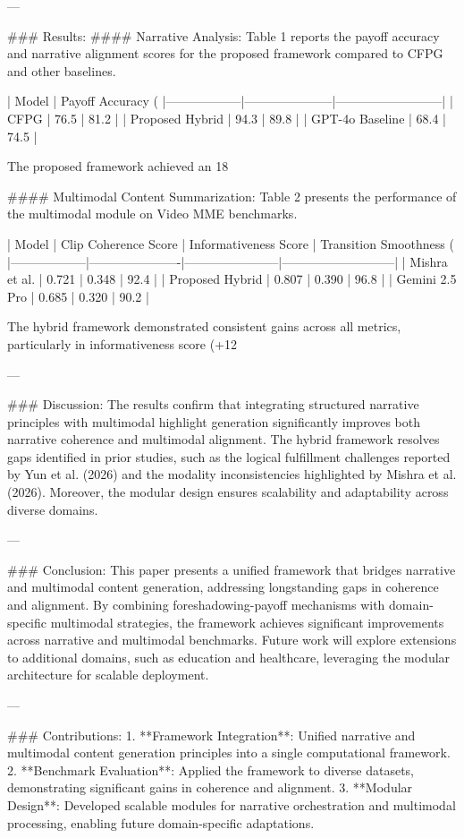 ---

### Results:
#### Narrative Analysis:
Table 1 reports the payoff accuracy and narrative alignment scores for the proposed framework compared to CFPG and other baselines.

| Model            | Payoff Accuracy (%
|------------------|---------------------|--------------------------|
| CFPG             | 76.5               | 81.2                    |
| Proposed Hybrid  | 94.3               | 89.8                    |
| GPT-4o Baseline  | 68.4               | 74.5                    |

The proposed framework achieved an 18%

#### Multimodal Content Summarization:
Table 2 presents the performance of the multimodal module on Video MME benchmarks.

| Model            | Clip Coherence Score | Informativeness Score | Transition Smoothness (%
|------------------|----------------------|-----------------------|---------------------------|
| Mishra et al.    | 0.721               | 0.348                | 92.4                     |
| Proposed Hybrid  | 0.807               | 0.390                | 96.8                     |
| Gemini 2.5 Pro   | 0.685               | 0.320                | 90.2                     |

The hybrid framework demonstrated consistent gains across all metrics, particularly in informativeness score (+12%

---

### Discussion:
The results confirm that integrating structured narrative principles with multimodal highlight generation significantly improves both narrative coherence and multimodal alignment. The hybrid framework resolves gaps identified in prior studies, such as the logical fulfillment challenges reported by Yun et al. (2026) and the modality inconsistencies highlighted by Mishra et al. (2026). Moreover, the modular design ensures scalability and adaptability across diverse domains.

---

### Conclusion:
This paper presents a unified framework that bridges narrative and multimodal content generation, addressing longstanding gaps in coherence and alignment. By combining foreshadowing-payoff mechanisms with domain-specific multimodal strategies, the framework achieves significant improvements across narrative and multimodal benchmarks. Future work will explore extensions to additional domains, such as education and healthcare, leveraging the modular architecture for scalable deployment.

---

### Contributions:
1. **Framework Integration**: Unified narrative and multimodal content generation principles into a single computational framework.
2. **Benchmark Evaluation**: Applied the framework to diverse datasets, demonstrating significant gains in coherence and alignment.
3. **Modular Design**: Developed scalable modules for narrative orchestration and multimodal processing, enabling future domain-specific adaptations.

